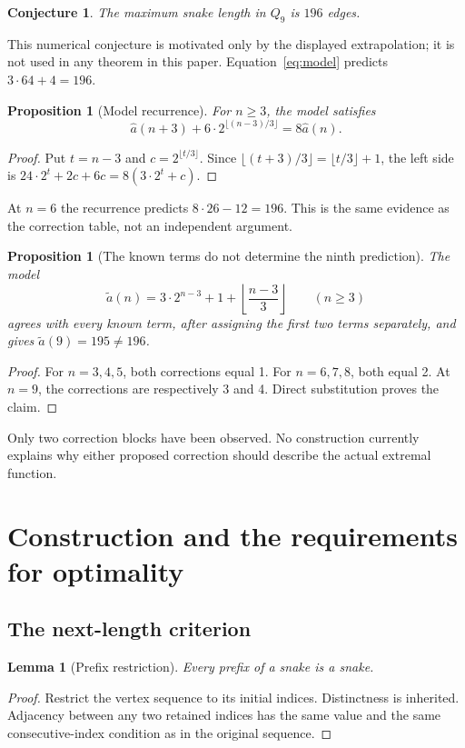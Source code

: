 \documentclass[11pt,a4paper]{article}
\newtheorem{proposition}[theorem]{Proposition}
\newtheorem{lemma}[theorem]{Lemma}
\newtheorem{conjecture}[theorem]{Conjecture}
\theoremstyle{definition}
\theoremstyle{remark}
\newcommand{\Q}{Q}
\begin{document}
\begin{conjecture}\label{conj:196}
The maximum snake length in $\Q_9$ is $196$ edges.
\end{conjecture}
This numerical conjecture is motivated only by the displayed extrapolation; it is not used in any theorem in this paper. Equation~\eqref{eq:model} predicts $3\cdot64+4=196$.

\begin{proposition}[Model recurrence]
For $n\ge3$, the model satisfies
\[
\widehat a(n+3)+6\cdot2^{\lfloor(n-3)/3\rfloor}=8\widehat a(n).
\]
\end{proposition}
\begin{proof}
Put $t=n-3$ and $c=2^{\lfloor t/3\rfloor}$. Since $\lfloor(t+3)/3\rfloor=\lfloor t/3\rfloor+1$, the left side is
$24\cdot2^t+2c+6c=8(3\cdot2^t+c)$.
\end{proof}
At $n=6$ the recurrence predicts $8\cdot26-12=196$. This is the same evidence as the correction table, not an independent argument.

\begin{proposition}[The known terms do not determine the ninth prediction]
The model
\[
\widetilde a(n)=3\cdot2^{n-3}+1+\left\lfloor\frac{n-3}{3}\right\rfloor
\qquad(n\ge3)
\]
agrees with every known term, after assigning the first two terms separately, and gives $\widetilde a(9)=195\ne196$.
\end{proposition}
\begin{proof}
For $n=3,4,5$, both corrections equal 1. For $n=6,7,8$, both equal 2. At $n=9$, the corrections are respectively 3 and 4. Direct substitution proves the claim.
\end{proof}
Only two correction blocks have been observed. No construction currently explains why either proposed correction should describe the actual extremal function.

\section{Construction and the requirements for optimality}\label{sec:optimality}
\subsection{The next-length criterion}
\begin{lemma}[Prefix restriction]\label{lem:prefix}
Every prefix of a snake is a snake.
\end{lemma}
\begin{proof}
Restrict the vertex sequence to its initial indices. Distinctness is inherited. Adjacency between any two retained indices has the same value and the same consecutive-index condition as in the original sequence.
\end{proof}
\end{document}
